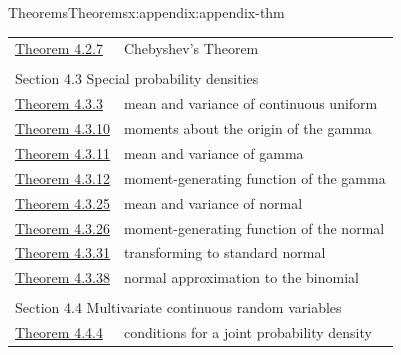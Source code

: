 \documentclass[oneside,10pt,]{book}
\begin{document}
\begin{appendixptx}{Theorems}{}{Theorems}{}{}{x:appendix:appendix-thm}
\begin{longtable}[l]{ll}
\hyperref[x:theorem:thm-chebyshev]{Theorem 4.2.7}& Chebyshev's Theorem\\
\multicolumn{2}{l}{\null}\\[1.5ex] \multicolumn{2}{l}{\large Section 4.3 Special probability densities}\\[0.5ex]
\hyperref[x:theorem:thm-cont-unif-mean]{Theorem 4.3.3}& mean and variance of continuous uniform\\
\hyperref[x:theorem:thm-cont-gamma-moments]{Theorem 4.3.10}& moments about the origin of the gamma\\
\hyperref[x:theorem:thm-cont-gamma-mean]{Theorem 4.3.11}& mean and variance of gamma\\
\hyperref[x:theorem:thm-cont-gamma-mgf]{Theorem 4.3.12}& moment-generating function of the gamma\\
\hyperref[x:theorem:thm-cont-normal-mean]{Theorem 4.3.25}& mean and variance of normal\\
\hyperref[x:theorem:thm-cont-normal-mgf]{Theorem 4.3.26}& moment-generating function of the normal\\
\hyperref[x:theorem:thm-cont-std-normal]{Theorem 4.3.31}& transforming to standard normal\\
\hyperref[x:theorem:thm-cont-normal-binom]{Theorem 4.3.38}& normal approximation to the binomial\\
\multicolumn{2}{l}{\null}\\[1.5ex] \multicolumn{2}{l}{\large Section 4.4 Multivariate continuous random variables}\\[0.5ex]
\hyperref[x:theorem:thm-continuous-th-3-7-cont]{Theorem 4.4.4}& conditions for a joint probability density\\
\end{longtable}
\end{appendixptx}
%
%
\typeout{************************************************}
\typeout{************************************************}
%
\end{document}
